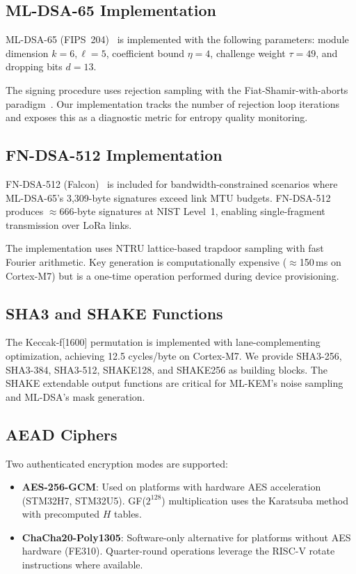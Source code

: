 \documentclass[conference,10pt]{IEEEtran}
\begin{document}
\subsection{ML-DSA-65 Implementation}

ML-DSA-65 (FIPS~204)~\cite{fips204} is implemented with the following parameters: module dimension $k=6, \ell=5$, coefficient bound $\eta=4$, challenge weight $\tau=49$, and dropping bits $d=13$.

The signing procedure uses rejection sampling with the Fiat-Shamir-with-aborts paradigm~\cite{lyubashevsky2012}. Our implementation tracks the number of rejection loop iterations and exposes this as a diagnostic metric for entropy quality monitoring.

\subsection{FN-DSA-512 Implementation}

FN-DSA-512 (Falcon)~\cite{falcon} is included for bandwidth-constrained scenarios where ML-DSA-65's 3,309-byte signatures exceed link MTU budgets. FN-DSA-512 produces $\approx$666-byte signatures at NIST Level~1, enabling single-fragment transmission over LoRa links.

The implementation uses NTRU lattice-based trapdoor sampling with fast Fourier arithmetic. Key generation is computationally expensive ($\approx$150\,ms on Cortex-M7) but is a one-time operation performed during device provisioning.

\subsection{SHA3 and SHAKE Functions}

The Keccak-f[1600] permutation is implemented with lane-complementing optimization, achieving 12.5 cycles/byte on Cortex-M7. We provide SHA3-256, SHA3-384, SHA3-512, SHAKE128, and SHAKE256 as building blocks. The SHAKE extendable output functions are critical for ML-KEM's noise sampling and ML-DSA's mask generation.

\subsection{AEAD Ciphers}

Two authenticated encryption modes are supported:
\begin{itemize}[leftmargin=*]
  \item \textbf{AES-256-GCM}: Used on platforms with hardware AES acceleration (STM32H7, STM32U5). GF($2^{128}$) multiplication uses the Karatsuba method with precomputed $H$ tables.
  \item \textbf{ChaCha20-Poly1305}: Software-only alternative for platforms without AES hardware (FE310). Quarter-round operations leverage the RISC-V rotate instructions where available.
\end{itemize}
\end{document}
